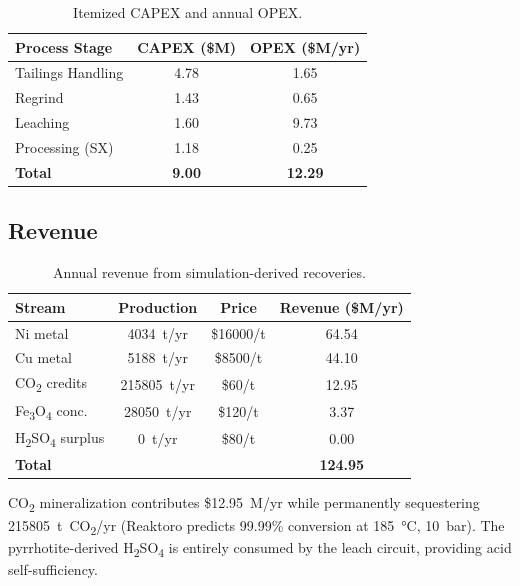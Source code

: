 \documentclass[11pt,a4paper]{article}
\begin{document}
\begin{table}[H]
\centering
\caption{Itemized CAPEX and annual OPEX.}
\label{tab:capex_opex}
\begin{tabular}{@{}lcc@{}}
\toprule
\textbf{Process Stage} & \textbf{CAPEX (\$M)} & \textbf{OPEX (\$M/yr)} \\
\midrule
Tailings Handling    & 4.78  & 1.65  \\
Regrind              & 1.43  & 0.65  \\
Leaching             & 1.60  & 9.73  \\
Processing (SX)      & 1.18  & 0.25  \\
\midrule
\textbf{Total}       & \textbf{9.00} & \textbf{12.29} \\
\bottomrule
\end{tabular}
\end{table}

\subsection{Revenue}

\begin{table}[H]
\centering
\caption{Annual revenue from simulation-derived recoveries.}
\label{tab:revenue}
\begin{tabular}{@{}lccc@{}}
\toprule
\textbf{Stream} & \textbf{Production} & \textbf{Price} & \textbf{Revenue (\$M/yr)} \\
\midrule
Ni metal       & \num{4034}~t/yr   & \$\num{16000}/t  & 64.54 \\
Cu metal       & \num{5188}~t/yr   & \$\num{8500}/t   & 44.10 \\
CO\textsubscript{2} credits & \num{215805}~t/yr & \$60/t & 12.95 \\
Fe\textsubscript{3}O\textsubscript{4} conc. & \num{28050}~t/yr & \$120/t & 3.37 \\
H\textsubscript{2}SO\textsubscript{4} surplus & 0~t/yr & \$80/t & 0.00 \\
\midrule
\textbf{Total} & & & \textbf{124.95} \\
\bottomrule
\end{tabular}
\end{table}

CO\textsubscript{2} mineralization contributes \$12.95~M/yr while
permanently sequestering \num{215805}~t~CO\textsubscript{2}/yr
(Reaktoro predicts 99.99\% conversion at \SI{185}{\celsius},
\SI{10}{bar}).  The pyrrhotite-derived H\textsubscript{2}SO\textsubscript{4}
is entirely consumed by the leach circuit, providing acid self-sufficiency.
\end{document}
